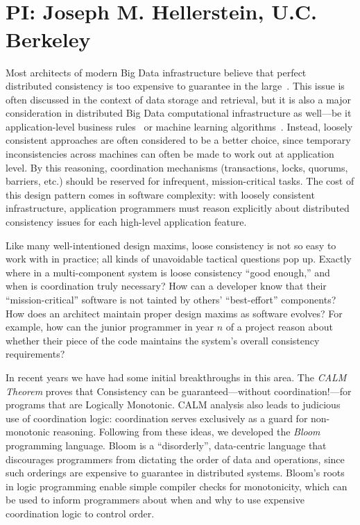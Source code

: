 % 
% 
% 
%   
\vspace{-2pt}
\section*{\mytitle\\
{\normalsize PI: Joseph M. Hellerstein, U.C. Berkeley}}
Most architects of modern Big Data infrastructure believe that perfect distributed consistency is too expensive to guarantee in the large~\cite{ladisreport}.  This issue is often discussed in the context of data storage and retrieval, but it is also a major consideration in distributed Big Data computational infrastructure as well---be it application-level business rules~\cite{finkelstein2011} or machine learning algorithms~\cite{hogwild}.  Instead, loosely consistent approaches are often considered to be a better choice, since temporary inconsistencies across machines can often be made to work out at application level. By this reasoning, coordination mechanisms (transactions, locks, quorums, barriers, etc.) should be reserved for infrequent, mission-critical tasks.  The cost of this design pattern comes in software complexity: with loosely consistent infrastructure, application programmers must reason explicitly about distributed consistency issues for each high-level application feature.

Like many well-intentioned design maxims, loose consistency is not so easy to work with in practice; all kinds of unavoidable tactical questions pop up.  Exactly where in a multi-component system is loose consistency ``good enough,'' and when is coordination truly necessary?  How can a developer know that their ``mission-critical'' software is not tainted by others' ``best-effort'' components?  How does an architect maintain proper design maxims as software evolves? For example, how can the junior programmer in year $n$ of a project reason about whether their piece of the code maintains the system's overall consistency requirements?

In recent years we have had some initial breakthroughs in this area.  The \emph{CALM Theorem} proves that Consistency can be guaranteed---without coordination!---for programs that are Logically Monotonic. CALM analysis also leads to judicious use of coordination logic: coordination serves exclusively as a guard for non-monotonic reasoning.  Following from these ideas, we developed the \emph{Bloom} programming language.  Bloom is a ``disorderly'', data-centric language that discourages programmers from dictating the order of data and operations, since such orderings are expensive to guarantee in distributed systems.  Bloom's roots in logic programming enable simple compiler checks for monotonicity, which can be used to inform programmers about when and why to use expensive coordination logic to control order.

